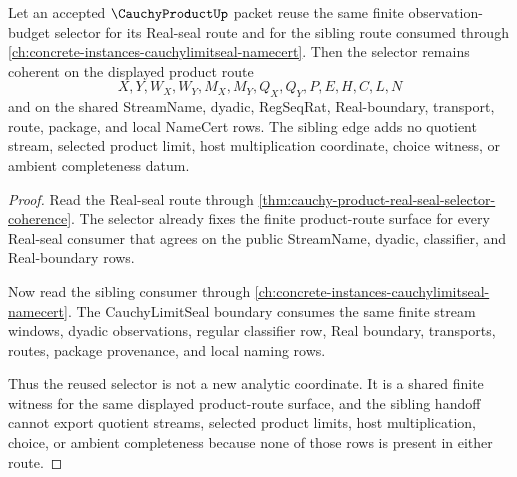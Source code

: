 \begin{theorem}
\label{thm:cauchy-product-limitseal-selector-coherence}
Let an accepted $\CauchyProductUp$ packet reuse the same finite observation-budget selector for its Real-seal route and for the sibling route consumed through \autoref{ch:concrete-instances-cauchylimitseal-namecert}. Then the selector remains coherent on the displayed product route
$$
X,Y,W_X,W_Y,M_X,M_Y,Q_X,Q_Y,P,E,H,C,L,N
$$
and on the shared StreamName, dyadic, RegSeqRat, Real-boundary, transport, route, package, and local NameCert rows. The sibling edge adds no quotient stream, selected product limit, host multiplication coordinate, choice witness, or ambient completeness datum.
\end{theorem}
\begin{proof}
Read the Real-seal route through \autoref{thm:cauchy-product-real-seal-selector-coherence}. The selector already fixes the finite product-route surface for every Real-seal consumer that agrees on the public StreamName, dyadic, classifier, and Real-boundary rows.

Now read the sibling consumer through \autoref{ch:concrete-instances-cauchylimitseal-namecert}. The CauchyLimitSeal boundary consumes the same finite stream windows, dyadic observations, regular classifier row, Real boundary, transports, routes, package provenance, and local naming rows.

Thus the reused selector is not a new analytic coordinate. It is a shared finite witness for the same displayed product-route surface, and the sibling handoff cannot export quotient streams, selected product limits, host multiplication, choice, or ambient completeness because none of those rows is present in either route.
\end{proof}

